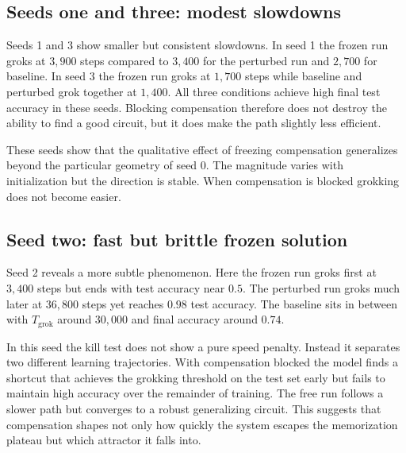 \subsection{Seeds one and three: modest slowdowns}

Seeds 1 and 3 show smaller but consistent slowdowns. In seed 1 the frozen run groks at $3{,}900$ steps compared to $3{,}400$ for the perturbed run and $2{,}700$ for baseline. In seed 3 the frozen run groks at $1{,}700$ steps while baseline and perturbed grok together at $1{,}400$. All three conditions achieve high final test accuracy in these seeds. Blocking compensation therefore does not destroy the ability to find a good circuit, but it does make the path slightly less efficient.

These seeds show that the qualitative effect of freezing compensation generalizes beyond the particular geometry of seed 0. The magnitude varies with initialization but the direction is stable. When compensation is blocked grokking does not become easier.

\subsection{Seed two: fast but brittle frozen solution}

Seed 2 reveals a more subtle phenomenon. Here the frozen run groks first at $3{,}400$ steps but ends with test accuracy near $0.5$. The perturbed run groks much later at $36{,}800$ steps yet reaches $0.98$ test accuracy. The baseline sits in between with $T_{\text{grok}}$ around $30{,}000$ and final accuracy around $0.74$.

In this seed the kill test does not show a pure speed penalty. Instead it separates two different learning trajectories. With compensation blocked the model finds a shortcut that achieves the grokking threshold on the test set early but fails to maintain high accuracy over the remainder of training. The free run follows a slower path but converges to a robust generalizing circuit. This suggests that compensation shapes not only how quickly the system escapes the memorization plateau but which attractor it falls into.
